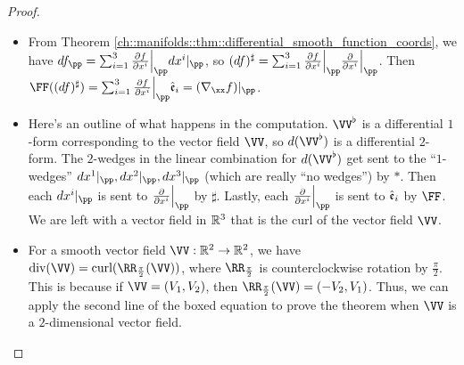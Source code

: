 \begin{proof}
    \mbox{} \\
    \begin{itemize}
        \item From Theorem \ref{ch::manifolds::thm::differential_smooth_function_coords}, we have $df_\pp = \sum_{i = 1}^3 \frac{\pd f}{\pd x^i}\Big|_\pp dx^i|_\pp$, so $(df)^\sharp = \sum_{i = 1}^3 \frac{\pd f}{\pd x^i}\Big|_\pp \frac{\pd}{\pd x^i}\Big|_\pp$. Then $\FF((df)^\sharp) = \sum_{i = 1}^3 \frac{\pd f}{\pd x^i}\Big|_\pp \see_i = (\nabla_\xx f)|_\pp$.
        \item Here's an outline of what happens in the computation. $\VV^\flat$ is a differential $1$-form corresponding to the vector field $\VV$, so $d(\VV^\flat)$ is a differential $2$-form. The $2$-wedges in the linear combination for $d(\VV^\flat)$ get sent to the ``$1$-wedges'' $dx^1|_\pp, dx^2|_\pp, dx^3|_\pp$ (which are really ``no wedges'') by $*$. Then each $dx^i|_\pp$ is sent to $\frac{\pd}{\pd x^i}\Big|_\pp$ by $\sharp$. Lastly, each $\frac{\pd}{\pd x^i}\Big|_\pp$ is sent to $\hat{\mathfrak{e}}_i$ by $\FF$. We are left with a vector field in $\mathbb{R}^3$ that is the curl of the vector field $\VV$.
        \item For a smooth vector field $\VV:\R^2 \rightarrow \R^2$, we have $\div(\VV) = \curl(\RR_{\frac{\pi}{2}}(\VV))$, where $\RR_{\frac{\pi}{2}}$ is counterclockwise rotation by $\frac{\pi}{2}$. This is because if $\VV = (V_1, V_2)$, then $\RR_{\frac{\pi}{2}}(\VV) = (-V_2, V_1)$. Thus, we can apply the second line of the boxed equation to prove the theorem when $\VV$ is a $2$-dimensional vector field.
    \end{itemize}    
\end{proof}

